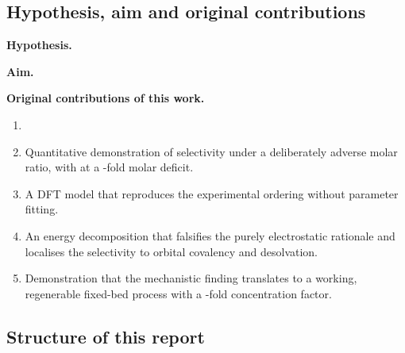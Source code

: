 \subsection{Hypothesis, aim and original contributions}
\label{sec:hypothesis}

\begin{noveltybox}
\textbf{Hypothesis.}

\medskip
\textbf{Aim.}

\medskip
\textbf{Original contributions of this work.}
\begin{enumerate}
  \item %
  \item Quantitative demonstration of \PbII{} selectivity under a deliberately adverse molar ratio,
        with \PbII{} at a -fold molar deficit.
  \item A DFT model that reproduces the experimental ordering without parameter fitting.
  \item An energy decomposition that falsifies the purely electrostatic rationale and localises the
        selectivity to orbital covalency and desolvation.
  \item Demonstration that the mechanistic finding translates to a working, regenerable fixed-bed
        process with a -fold concentration factor.
\end{enumerate}
\end{noveltybox}

\subsection{Structure of this report}
\label{sec:structure}
